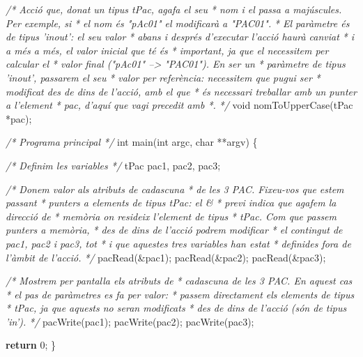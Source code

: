 \documentclass[]{book}
\newenvironment{Shaded}{\begin{snugshade}}{\end{snugshade}}
\newcommand{\DataTypeTok}[1]{\textcolor[rgb]{0.13,0.29,0.53}{#1}}
\newcommand{\DecValTok}[1]{\textcolor[rgb]{0.00,0.00,0.81}{#1}}
\newcommand{\CommentTok}[1]{\textcolor[rgb]{0.56,0.35,0.01}{\textit{#1}}}
\newcommand{\ControlFlowTok}[1]{\textcolor[rgb]{0.13,0.29,0.53}{\textbf{#1}}}
\newcommand{\NormalTok}[1]{#1}
\begin{document}
\begin{Shaded}
\begin{Highlighting}[]
\CommentTok{/* Acció que, donat un tipus tPac, agafa el seu}
\CommentTok{ * nom i el passa a majúscules. Per exemple, si}
\CommentTok{ * el nom és "pAc01" el modificarà a "PAC01".}
\CommentTok{ * El paràmetre és de tipus 'inout': el seu valor}
\CommentTok{ * abans i després d'executar l'acció haurà canviat}
\CommentTok{ * i a més a més, el valor inicial que té és}
\CommentTok{ * important, ja que el necessitem per calcular el}
\CommentTok{ * valor final ("pAc01" --> "PAC01"). En ser un}
\CommentTok{ * paràmetre de tipus 'inout', passarem el seu}
\CommentTok{ * valor per referència: necessitem que pugui ser}
\CommentTok{ * modificat des de dins de l'acció, amb el que}
\CommentTok{ * és necessari treballar amb un punter a l'element}
\CommentTok{ * pac, d'aquí que vagi precedit amb *.}
\CommentTok{ */}
\DataTypeTok{void}\NormalTok{ nomToUpperCase(tPac *pac);}

\CommentTok{/* Programa principal */}
\DataTypeTok{int}\NormalTok{ main(}\DataTypeTok{int}\NormalTok{ argc, }\DataTypeTok{char}\NormalTok{ **argv) \{}
    
    \CommentTok{/* Definim les variables */}
\NormalTok{    tPac pac1, pac2, pac3;}

    \CommentTok{/* Donem valor als atributs de cadascuna}
\CommentTok{     * de les 3 PAC. Fixeu-vos que estem passant}
\CommentTok{     * punters a elements de tipus tPac: el &}
\CommentTok{     * previ indica que agafem la direcció de }
\CommentTok{     * memòria on resideix l'element de tipus }
\CommentTok{     * tPac. Com que passem punters a memòria, }
\CommentTok{     * des de dins de l'acció podrem modificar}
\CommentTok{     * el contingut de pac1, pac2 i pac3, tot}
\CommentTok{     * i que aquestes tres variables han estat}
\CommentTok{     * definides fora de l'àmbit de l'acció.}
\CommentTok{     */}
\NormalTok{    pacRead(&pac1);}
\NormalTok{    pacRead(&pac2);}
\NormalTok{    pacRead(&pac3);}
    
    \CommentTok{/* Mostrem per pantalla els atributs de}
\CommentTok{     * cadascuna de les 3 PAC. En aquest cas}
\CommentTok{     * el pas de paràmetres es fa per valor:}
\CommentTok{     * passem directament els elements de tipus}
\CommentTok{     * tPac, ja que aquests no seran modificats}
\CommentTok{     * des de dins de l'acció (són de tipus 'in').}
\CommentTok{     */}
\NormalTok{    pacWrite(pac1);}
\NormalTok{    pacWrite(pac2);}
\NormalTok{    pacWrite(pac3);}

    \ControlFlowTok{return} \DecValTok{0}\NormalTok{;}
\NormalTok{\}}


\end{Highlighting}
\end{Shaded}
\end{document}
